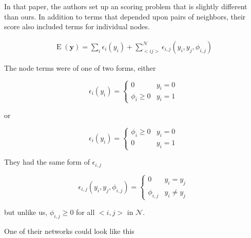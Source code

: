 In that paper, the authors set up an scoring problem that is slightly
different than ours. In addition to terms that depended upon pairs of
neighbors, their score also included terms for individual nodes.

\begin{align}
\operatorname{E}(\mathbf{y}) = \sum_i\epsilon_i(y_i) + \sum_{<i
  j>}^{\mathcal{N}}\epsilon_{i,j}(y_i,y_j,\phi_{i,j})
\end{align}

\noindent
The node terms were of one of two forms, either

\begin{equation}
\epsilon_{i}(y_i) = \begin{cases}
  0 &y_i = 0 \\
  \phi_{i} \geq 0 &y_i = 1
\end{cases}
\end{equation}

\noindent
or 

\begin{equation}
\epsilon_{i}(y_i) = \begin{cases}
  \phi_{i} \geq 0 &y_i = 0 \\
  0 &y_i = 1
\end{cases}
\end{equation}

\noindent
They had the same form of $\epsilon_{i,j}$

\begin{equation}
\epsilon_{i,j}(y_i,y_j,\phi_{i,j}) = \begin{cases}
  0 &y_i = y_j \\
  \phi_{i,j} &y_i \neq y_j
\end{cases}
\end{equation}

\noindent
but unlike us, $\phi_{i,j} \geq 0$ for all $<i, j>$ in $\mathcal{N}$. 

One of their networks could look like this

\begin{figure}[!h]
\centering


\end{figure}


